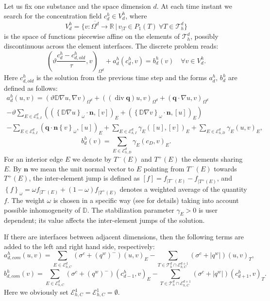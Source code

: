 \documentclass[a4paper]{article}
\def\abs#1{\lvert#1\rvert}
\def\avg#1{\left\{#1\right\}_\omega}
\def\D{{\tn D}}
\def\div{\operatorname{div}}
\def\Ehcom{\mathcal E_{h,C}}         %
\def\Ehdir{\mathcal E_{h,D}}         %
\def\Ehint{\mathcal E_{h,I}}       %
\def\jmp#1{[#1]}
\def\n{\vc n}
\def\vc#1{\mathbf{\boldsymbol{#1}}}     %
\def\R{\mathbb R}
\def\sc#1#2{\left(#1,#2\right)}
\def\Th{\mathcal T_h}       %
\def\th{\vartheta}
\def\tn#1{{\mathbb{#1}}}    %
\def\where{\,|\,}
\begin{document}
Let us fix one substance and the space dimension $d$.
At each time instant we search for the concentration field $c_d^h\in V_d^h$, where
$$ V_d^h = \{v:\overline{\Omega^d}\to\R\where v_{|T}\in P_1(T)~\forall T\in\Th^d\} $$
is the space of functions piecewise affine on the elements of $\Th^d$, possibly discontinuous across the element interfaces.
The discrete problem reads:
$$ \sc{\th\frac{c_d^h-c^h_{d,old}}\tau}{v}_{\Omega^d} + a^h_d(c^h_d,v) = b^h_d(v) \quad \forall v\in V^h_d. $$
Here $c^h_{d,old}$ is the solution from the previous time step and the forms $a^h_d$, $b^h_d$ are defined as follows:
\begin{multline*}
a^h_d(u,v) = \sc{\th\D\nabla u}{\nabla v}_{\Omega^d}
+ \sc{(\div\vc q)u}{v}_{\Omega^d}
+ \sc{\vc q\cdot\nabla u}{v}_{\Omega^d}\\
- \th\sum_{E\in\Ehint^d}\left(\sc{\avg{\D\nabla u}\cdot\n}{\jmp{v}}_E + \sc{\avg{\D\nabla v}\cdot\n}{\jmp{u}}_E\right)\\
- \sum_{E\in\Ehint^d}\sc{\vc q\cdot\n\avg{v}}{\jmp{u}}_E
+ \sum_{E\in\Ehint^d}\gamma_E\sc{\jmp{u}}{\jmp{v}}_E
+ \sum_{E\in\Ehdir^d}\gamma_E\sc{u}{v}_E,
\end{multline*}
% 
\begin{equation*}
b^h_d(v) = \sum_{E\in\Ehdir^d}\gamma_E\sc{c_D}{v}_E.
\end{equation*}
For an interior edge $E$ we denote by $T^-(E)$ and $T^+(E)$ the elements sharing $E$.
By $\n$ we mean the unit normal vector to $E$ pointing from $T^-(E)$ towards $T^+(E)$, the inter-element jump is defined as $\jmp{f}=f_{|T^-(E)}-f_{|T^+(E)}$, and $\avg{f}=\omega f_{|T^-(E)} + (1-\omega) f_{|T^+(E)}$ denotes a weighted average of the quantity $f$.
The weight $\omega$ is chosen in a specific way (see \cite{ern_stephansen_zunino} for details) taking into account possible inhomogeneity of $\D$.
The stabilization parameter $\gamma_E>0$ is user dependent; its value affects the inter-element jumps of the solution.

If there are interfaces between adjacent dimensions, then the following terms are added to the left and right hand side, respectively:
$$ a^h_{d,com}(u,v) = \sum_{E\in\Ehcom^d} (\sigma^c+(q^w)^-)\sc{u}{v}_E - \sum_{T\in\Th^d\cap\Ehcom^{d+1}}(\sigma^c+\abs{q^w})\sc{u}{v}_T, $$
$$ b^h_{d,com}(v) = \sum_{E\in\Ehcom^d} (\sigma^c+(q^w)^-)\sc{c^h_{d-1}}{v}_E - \sum_{T\in\Th^d\cap\Ehcom^{d+1}}(\sigma^c+\abs{q^w})\sc{c^h_{d+1}}{v}_T. $$
Here we obviously set $\Ehcom^4=\Ehcom^1=\emptyset$.
\end{document}
